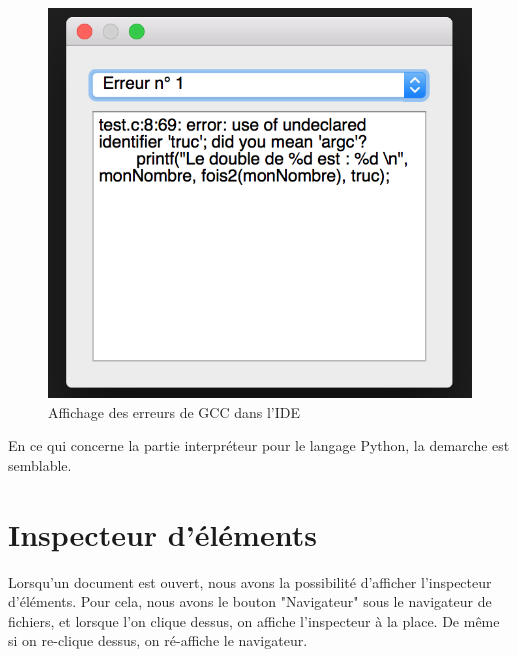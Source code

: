 \documentclass[a4paper,12pt]{article}
\begin{document}
			\begin{figure}[h!]
				\begin{center}
					\includegraphics[scale=0.6]{images/fenErreurEx}
					\caption{Affichage des erreurs de GCC dans l'IDE}
				\end{center}
			\end{figure}

		En ce qui concerne la partie interpréteur pour le langage Python, la demarche est semblable. 


\section{Inspecteur d'éléments}

	Lorsqu'un document est ouvert, nous avons la possibilité d'afficher l'inspecteur d'éléments. Pour cela, nous avons le bouton "Navigateur" sous le navigateur de fichiers, et lorsque l'on clique dessus, on affiche l'inspecteur à la place. De même si on re-clique dessus, on ré-affiche le navigateur.
	
\end{document}
